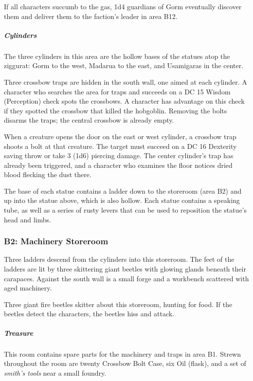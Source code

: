 \documentclass[10pt,a4paper,twoside,bg=print,twocolumn,openany,nodeprecatedcode]{dndbook}
\begin{document}
If all characters succumb to the gas, 1d4 guardians of Gorm eventually discover them and deliver them to the faction's leader in area B12.

\subparagraph{Cylinders}
The three cylinders in this area are the hollow bases of the statues atop the ziggurat: Gorm to the west, Madarua to the east, and Usamigaras in the center.

Three crossbow traps are hidden in the south wall, one aimed at each cylinder. A character who searches the area for traps and succeeds on a DC 15 Wisdom (Perception) check spots the crossbows. A character has advantage on this check if they spotted the crossbow that killed the hobgoblin. Removing the bolts disarms the traps; the central crossbow is already empty.

When a creature opens the door on the east or west cylinder, a crossbow trap shoots a bolt at that creature. The target must succeed on a DC 16 Dexterity saving throw or take 3 (1d6) piercing damage. The center cylinder's trap has already been triggered, and a character who examines the floor notices dried blood flecking the dust there.

The base of each statue contains a ladder down to the storeroom (area B2) and up into the statue above, which is also hollow. Each statue contains a speaking tube, as well as a series of rusty levers that can be used to reposition the statue's head and limbs.

\subsubsection{B2: Machinery Storeroom}
\begin{DndReadAloud}{}
Three ladders descend from the cylinders into this storeroom. The feet of the ladders are lit by three skittering giant beetles with glowing glands beneath their carapaces. Against the south wall is a small forge and a workbench scattered with aged machinery.

\end{DndReadAloud}

Three giant fire beetles skitter about this storeroom, hunting for food. If the beetles detect the characters, the beetles hiss and attack.

\subparagraph{Treasure}
This room contains spare parts for the machinery and traps in area B1. Strewn throughout the room are twenty Crossbow Bolt Case, six Oil (flask), and a set of \textit{smith's tools} near a small foundry.
\end{document}
